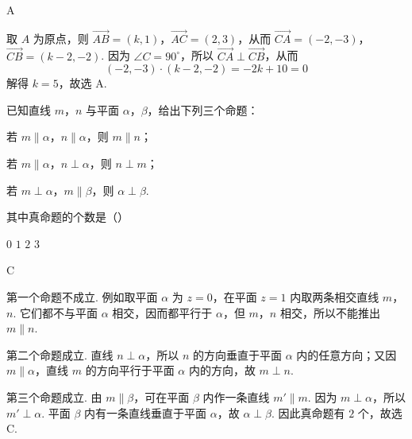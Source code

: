 \begin{answer}
A
\end{answer}

\begin{solution}
取 \(A\) 为原点，则 \(\overrightarrow{AB}=(k,1)\)，\(\overrightarrow{AC}=(2,3)\)，从而 \(\overrightarrow{CA}=(-2,-3)\)，\(\overrightarrow{CB}=(k-2,-2)\).
因为 \(\angle C=90^{\circ}\)，所以 \(\overrightarrow{CA}\perp\overrightarrow{CB}\)，从而
\[
(-2,-3)\cdot(k-2,-2)=-2k+10=0
\]
解得 \(k=5\)，故选 A.
\end{solution}



\begin{problem}
已知直线 \(m\)，\(n\) 与平面 \(\alpha\)，\(\beta\)，给出下列三个命题：

\begin{circlelist}
\item 若 \(m \parallel \alpha\)，\(n \parallel \alpha\)，则 \(m \parallel n\)；
\item 若 \(m \parallel \alpha\)，\(n \perp \alpha\)，则 \(n \perp m\)；
\item 若 \(m \perp \alpha\)，\(m \parallel \beta\)，则 \(\alpha \perp \beta\).
\end{circlelist}

其中真命题的个数是（\quad）

\choices
    {\(0\)}
    {\(1\)}
    {\(2\)}
    {\(3\)}
\end{problem}

\begin{answer}
C
\end{answer}

\begin{solution}
第一个命题不成立. 例如取平面 \(\alpha\) 为 \(z=0\)，在平面 \(z=1\) 内取两条相交直线 \(m\)，\(n\). 它们都不与平面 \(\alpha\) 相交，因而都平行于 \(\alpha\)，但 \(m\)，\(n\) 相交，所以不能推出 \(m\parallel n\).

第二个命题成立. 直线 \(n\perp\alpha\)，所以 \(n\) 的方向垂直于平面 \(\alpha\) 内的任意方向；又因 \(m\parallel\alpha\)，直线 \(m\) 的方向平行于平面 \(\alpha\) 内的方向，故 \(m\perp n\).

第三个命题成立. 由 \(m\parallel\beta\)，可在平面 \(\beta\) 内作一条直线 \(m'\parallel m\). 因为 \(m\perp\alpha\)，所以 \(m'\perp\alpha\). 平面 \(\beta\) 内有一条直线垂直于平面 \(\alpha\)，故 \(\alpha\perp\beta\). 因此真命题有 \(2\) 个，故选 C.
\end{solution}



